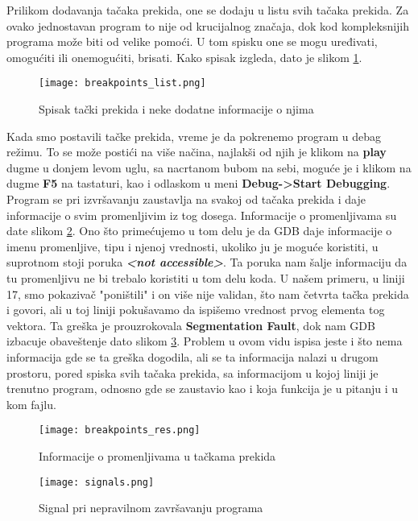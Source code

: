 \documentclass[a4paper]{article}
\begin{document}
Prilikom dodavanja tačaka prekida, one se dodaju u listu svih tačaka prekida. Za ovako jednostavan program to 
nije od krucijalnog značaja, dok kod kompleksnijih programa može biti od velike pomoći. U tom spisku one se mogu uređivati, 
omogućiti ili onemogućiti, brisati. Kako spisak izgleda, dato je slikom \ref{fig:points_list}.

\begin{figure}[h!]
\begin{center}
\texttt{[image: breakpoints\_list.png]}
\end{center}
\caption{Spisak tački prekida i neke dodatne informacije o njima}
\label{fig:points_list}
\end{figure}

Kada smo postavili tačke prekida, vreme je da pokrenemo program u debag režimu. To se može postići na više načina,
najlakši od njih je klikom na \textbf{play} dugme u donjem levom uglu, sa nacrtanom bubom na sebi, moguće je i klikom na 
dugme \textbf{F5} na tastaturi, kao i odlaskom u meni \textbf{Debug->Start Debugging}\cite{QT}.
\\

Program se pri izvršavanju zaustavlja na svakoj od tačaka prekida i daje informacije o svim promenljivim iz tog dosega. 
Informacije o promenljivama su date slikom \ref{fig:points_res}. 
Ono što primećujemo u tom delu je da GDB daje informacije o imenu promenljive, tipu i njenoj vrednosti, 
ukoliko ju je moguće koristiti, u suprotnom stoji poruka \textbf{\textit{<not accessible>}}. Ta poruka nam šalje
informaciju da tu promenljivu ne bi trebalo koristiti u tom delu koda. U našem primeru, u liniji 17, smo pokazivač "poništili" {} i 
on više nije validan, što nam četvrta tačka prekida i govori, ali u toj liniji pokušavamo da ispišemo vrednost prvog elementa
tog vektora. Ta greška je prouzrokovala \textbf{Segmentation Fault}, dok nam GDB izbacuje obaveštenje dato slikom \ref{fig:signals}.
Problem u ovom vidu ispisa jeste i što nema informacija gde se ta greška dogodila, ali se ta informacija nalazi u drugom prostoru, pored 
spiska svih tačaka prekida, sa informacijom u kojoj liniji je trenutno program, odnosno gde se zaustavio kao i koja funkcija je u pitanju i u kom fajlu.

\begin{figure}[h!]
\begin{center}
\texttt{[image: breakpoints\_res.png]}
\end{center}
\caption{Informacije o promenljivama u tačkama prekida}
\label{fig:points_res}
\end{figure}


\begin{figure}[h!]
\begin{center}
\texttt{[image: signals.png]}
\end{center}
\caption{Signal pri nepravilnom završavanju programa}
\label{fig:signals}
\end{figure}
\end{document}

